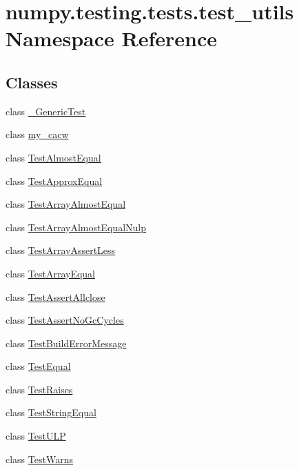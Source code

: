 \hypertarget{namespacenumpy_1_1testing_1_1tests_1_1test__utils}{}\section{numpy.\+testing.\+tests.\+test\+\_\+utils Namespace Reference}
\label{namespacenumpy_1_1testing_1_1tests_1_1test__utils}
\subsection*{Classes}
\begin{DoxyCompactItemize}
\item 
class \hyperlink{classnumpy_1_1testing_1_1tests_1_1test__utils_1_1__GenericTest}{\+\_\+\+Generic\+Test}
\item 
class \hyperlink{classnumpy_1_1testing_1_1tests_1_1test__utils_1_1my__cacw}{my\+\_\+cacw}
\item 
class \hyperlink{classnumpy_1_1testing_1_1tests_1_1test__utils_1_1TestAlmostEqual}{Test\+Almost\+Equal}
\item 
class \hyperlink{classnumpy_1_1testing_1_1tests_1_1test__utils_1_1TestApproxEqual}{Test\+Approx\+Equal}
\item 
class \hyperlink{classnumpy_1_1testing_1_1tests_1_1test__utils_1_1TestArrayAlmostEqual}{Test\+Array\+Almost\+Equal}
\item 
class \hyperlink{classnumpy_1_1testing_1_1tests_1_1test__utils_1_1TestArrayAlmostEqualNulp}{Test\+Array\+Almost\+Equal\+Nulp}
\item 
class \hyperlink{classnumpy_1_1testing_1_1tests_1_1test__utils_1_1TestArrayAssertLess}{Test\+Array\+Assert\+Less}
\item 
class \hyperlink{classnumpy_1_1testing_1_1tests_1_1test__utils_1_1TestArrayEqual}{Test\+Array\+Equal}
\item 
class \hyperlink{classnumpy_1_1testing_1_1tests_1_1test__utils_1_1TestAssertAllclose}{Test\+Assert\+Allclose}
\item 
class \hyperlink{classnumpy_1_1testing_1_1tests_1_1test__utils_1_1TestAssertNoGcCycles}{Test\+Assert\+No\+Gc\+Cycles}
\item 
class \hyperlink{classnumpy_1_1testing_1_1tests_1_1test__utils_1_1TestBuildErrorMessage}{Test\+Build\+Error\+Message}
\item 
class \hyperlink{classnumpy_1_1testing_1_1tests_1_1test__utils_1_1TestEqual}{Test\+Equal}
\item 
class \hyperlink{classnumpy_1_1testing_1_1tests_1_1test__utils_1_1TestRaises}{Test\+Raises}
\item 
class \hyperlink{classnumpy_1_1testing_1_1tests_1_1test__utils_1_1TestStringEqual}{Test\+String\+Equal}
\item 
class \hyperlink{classnumpy_1_1testing_1_1tests_1_1test__utils_1_1TestULP}{Test\+U\+LP}
\item 
class \hyperlink{classnumpy_1_1testing_1_1tests_1_1test__utils_1_1TestWarns}{Test\+Warns}
\end{DoxyCompactItemize}
